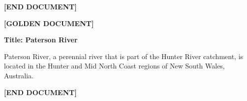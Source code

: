 \begin{frame}[t]
    \vspace{0.03cm}

    \textbf{[END DOCUMENT]}

    \vspace{0.06cm}

    \textbf{[GOLDEN DOCUMENT]}

    \textbf{Title: Paterson River}

    Paterson River, a perennial river that is part of the Hunter River
    catchment, is located in the Hunter and Mid North Coast regions of
    New South Wales, Australia.

    \vspace{0.03cm}

    \textbf{[END DOCUMENT]}

\end{frame}



